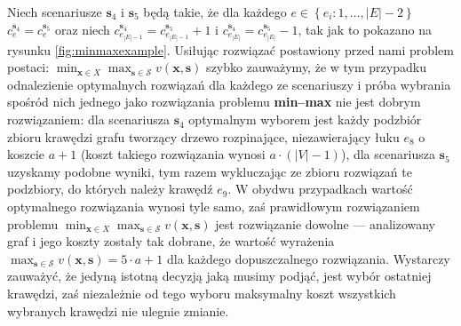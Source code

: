 Niech scenariusze $\textbf{s}_{4}$ i $\textbf{s}_{5}$ będą takie, że dla każdego $e \in \left\{ e_{i} : 1, \dots, \left| E \right| - 2 \right\}$ $c^{\textbf{s}_{4}}_{e} = c^{\textbf{s}_{5}}_{e}$ oraz niech $c^{\textbf{s}_{4}}_{e_{\left| E \right| - 1}} = c^{\textbf{s}_{5}}_{e_{\left| E \right| - 1}} + 1$ i $c^{\textbf{s}_{4}}_{e_{\left| E \right|}} = c^{\textbf{s}_{5}}_{e_{\left| E \right|}} - 1$, tak jak to pokazano na rysunku \ref{fig:minmaxexample}. Usiłując rozwiązać postawiony przed nami problem postaci: $\min_{\textbf{x} \in X} \max_{\textbf{s} \in \mathcal{S}} v \left( \textbf{x}, \textbf{s} \right)$ szybko zauważymy, że w tym przypadku odnalezienie optymalnych rozwiązań dla każdego ze scenariuszy i próba wybrania spośród nich jednego jako rozwiązania problemu \textbf{min--max} nie jest dobrym rozwiązaniem: dla scenariusza $\textbf{s}_{4}$ optymalnym wyborem jest każdy podzbiór zbioru krawędzi grafu tworzący drzewo rozpinające, niezawierający łuku $e_{8}$ o koszcie $a+1$ (koszt takiego rozwiązania wynosi $a \cdot \left( \left| V \right| - 1 \right)$), dla scenariusza $\textbf{s}_{5}$ uzyskamy podobne wyniki, tym razem wykluczając ze zbioru rozwiązań te podzbiory, do których należy krawędź $e_{9}$. W obydwu przypadkach wartość optymalnego rozwiązania wynosi tyle samo, zaś prawidłowym rozwiązaniem problemu $\min_{\textbf{x} \in X} \max_{\textbf{s} \in \mathcal{S}} v \left( \textbf{x}, \textbf{s} \right)$ jest rozwiązanie dowolne --- analizowany graf i jego koszty zostały tak dobrane, że wartość wyrażenia $\max_{\textbf{s} \in \mathcal{S}} v \left( \textbf{x}, \textbf{s} \right) = 5 \cdot a + 1$ dla każdego dopuszczalnego rozwiązania. Wystarczy zauważyć, że jedyną istotną decyzją jaką musimy podjąć, jest wybór ostatniej krawędzi, zaś niezależnie od tego wyboru maksymalny koszt wszystkich wybranych krawędzi nie ulegnie zmianie.

